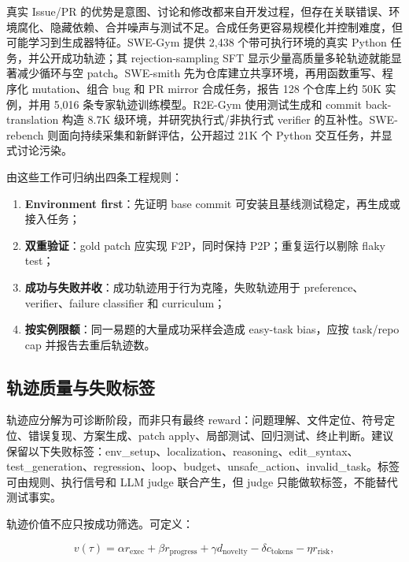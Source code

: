 \documentclass[10pt,a4paper,UTF8,fontset=none]{ctexart}
\newcommand{\ident}[1]{{\rmfamily #1}}
\begin{document}
真实 Issue/PR 的优势是意图、讨论和修改都来自开发过程，但存在关联错误、环境腐化、隐藏依赖、合并噪声与测试不足。合成任务更容易规模化并控制难度，但可能学习到生成器特征。SWE-Gym 提供 2,438 个带可执行环境的真实 Python 任务，并公开成功轨迹；其 rejection-sampling SFT 显示少量高质量多轮轨迹就能显著减少循环与空 patch\cite{pan2024swegym}。SWE-smith 先为仓库建立共享环境，再用函数重写、程序化 mutation、组合 bug 和 PR mirror 合成任务，报告 128 个仓库上约 50K 实例，并用 5,016 条专家轨迹训练模型\cite{yang2025swesmith}。R2E-Gym 使用测试生成和 commit back-translation 构造 8.7K 级环境，并研究执行式/非执行式 verifier 的互补性\cite{jain2025r2egym}。SWE-rebench 则面向持续采集和新鲜评估，公开超过 21K 个 Python 交互任务，并显式讨论污染\cite{badertdinov2025swerebench}。

由这些工作可归纳出四条工程规则：

\begin{enumerate}
  \item \textbf{Environment first}：先证明 base commit 可安装且基线测试稳定，再生成或接入任务；
  \item \textbf{双重验证}：gold patch 应实现 F2P，同时保持 P2P；重复运行以剔除 flaky test；
  \item \textbf{成功与失败并收}：成功轨迹用于行为克隆，失败轨迹用于 preference、verifier、failure classifier 和 curriculum；
  \item \textbf{按实例限额}：同一易题的大量成功采样会造成 easy-task bias，应按 task/repo cap 并报告去重后轨迹数。
\end{enumerate}

\subsection{轨迹质量与失败标签}

轨迹应分解为可诊断阶段，而非只有最终 reward：问题理解、文件定位、符号定位、错误复现、方案生成、patch apply、局部测试、回归测试、终止判断。建议保留以下失败标签：\ident{env\_setup}、\ident{localization}、\ident{reasoning}、\ident{edit\_syntax}、\ident{test\_generation}、\ident{regression}、\ident{loop}、\ident{budget}、\ident{unsafe\_action}、\ident{invalid\_task}。标签可由规则、执行信号和 LLM judge 联合产生，但 judge 只能做软标签，不能替代测试事实。

轨迹价值不应只按成功筛选。可定义：

\begin{equation}
v(\tau)=\alpha r_{\mathrm{exec}}+\beta r_{\mathrm{progress}}+\gamma d_{\mathrm{novelty}}-\delta c_{\mathrm{tokens}}-\eta r_{\mathrm{risk}},
\label{eq:trajectory-value}
\end{equation}
\end{document}
